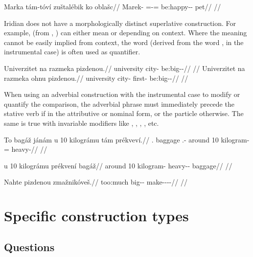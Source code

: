 \ex
\begingl
\gla Marka tám-tóví zuštalébik ko oblašc//
\glb Marek-\Acc{} \Comp{}=\Rz{}-\Gen{}= be:happy-\Ben{}-\Pf{} \Lnk{} pet//
\glft {}//
\endgl
\xe

Iridian does not have a morphologically distinct superlative construction. For example,  (from , ) can either mean  or  depending on context. Where the meaning cannot be easily implied from context, the word  (derived from the word ,  in the instrumental case) is often used as quantifier.

\pex
\a
\begingl
\gla Univerzitet na razmeka pizdenou.//
\glb university \Loc{} city-\Acc{} be:big-\Comp{}-\Nz{}//
\glft {}//
\endgl
\a
\begingl
\gla Univerzitet na razmeka ohnu pizdenou.//
\glb university \Loc{} city-\Acc{} first-\Ins{} be:big-\Comp{}-\Nz{}//
\glft {}//
\endgl
\xe

When using an adverbial construction with the instrumental case to modify or quantify the comparison, the adverbial phrase must immediately precede the stative verb if in the attributive or nominal form, or the particle  otherwise. The same is true with invariable modifiers like , , , , etc.

\ex
\begingl
\gla To bagáž jánám u 10 kilográmu tám prékveví.//
\glb \Dem{}.\Prox{} baggage \Dem{}.\Med{}-\Agt{} around 10 kilogram-\Ins{} \Comp{}= heavy-\Cont{}//
\glft {}//
\endgl
\xe

\ex
\begingl
\gla u 10 kilográmu prékvení bagáž//
\glb around 10 kilogram-\Ins{} heavy-\Comp{}-\Att{} baggage//
\glft {}//
\endgl
\xe

\ex
\begingl
\gla Nahte pizdenou zmažnikóveš.//
\glb too:much big-\Comp{}-\Nz{} make-\Pv{}-\Pf{}-\Nz{}-\Second{}\Sg{}//
\glft {}//
\endgl
\xe

\section{Specific construction types}
\subsection{Questions}

